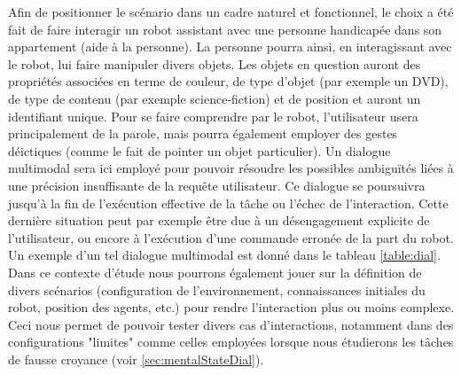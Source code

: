 \documentclass[a4paper,11pt,twoside]{StyleThese}
\begin{document}
Afin de positionner le scénario dans un cadre naturel et fonctionnel, le choix a été
fait de faire interagir un robot assistant avec une personne handicapée dans son appartement (aide
à la personne). La personne pourra ainsi, en interagissant avec le robot, lui faire manipuler divers objets. Les objets en question auront des propriétés associées en terme de couleur, de type d'objet (par exemple un DVD), de type de contenu (par exemple science-fiction) et de position et auront un identifiant unique. Pour se faire comprendre
par le robot, l’utilisateur usera principalement de la parole, mais pourra également employer des gestes déictiques (comme le fait de pointer un objet particulier).
Un dialogue multimodal sera ici employé pour pouvoir résoudre les possibles ambiguïtés liées à une précision insuffisante de la requête utilisateur.
Ce dialogue se poursuivra jusqu’à la fin de l’exécution effective de la tâche ou
l’échec de l’interaction. Cette dernière situation peut par exemple être due à un désengagement explicite de l’utilisateur, ou encore à l’exécution d’une commande erronée
de la part du robot. Un exemple d’un tel dialogue multimodal est donné dans le tableau \ref{table:dial}.
Dans ce contexte d’étude nous pourrons également jouer sur la définition de divers
scénarios (configuration de l’environnement, connaissances initiales du robot, position
des agents, etc.) pour rendre l’interaction plus ou moins complexe. Ceci nous permet de
pouvoir tester divers cas d’interactions, notamment dans des configurations "limites" comme celles employées lorsque nous étudierons les tâches de fausse croyance (voir \ref{sec:mentalStateDial}).
\end{document}

